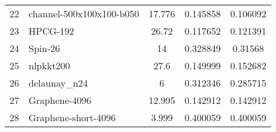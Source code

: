 \begin{tabular}{|l|l|S[round-mode=places,round-precision=2]|S[round-mode=places,round-precision=4]|S[round-mode=places,round-precision=4]|}
{22}& {	channel-500x100x100-b050  }	& 17.776	& 0.145858	& 0.106092	\\
{23}& {	HPCG-192                  }	& 26.72	& 0.117652	& 0.121391	\\
{24}& {	Spin-26                   }	& 14	& 0.328849	& 0.31568	\\
{25}& {	nlpkkt200                 }	& 27.6	& 0.149999	& 0.152682	\\
{26}& {	delaunay\_n24              }	& 6	& 0.312346	& 0.285715	\\
{27}& {	Graphene-4096             }	& 12.995	& 0.142912	& 0.142912	\\
{28}& {	Graphene-short-4096       }	& 3.999	& 0.400059	& 0.400059	\\
\bottomrule
\end{tabular}


